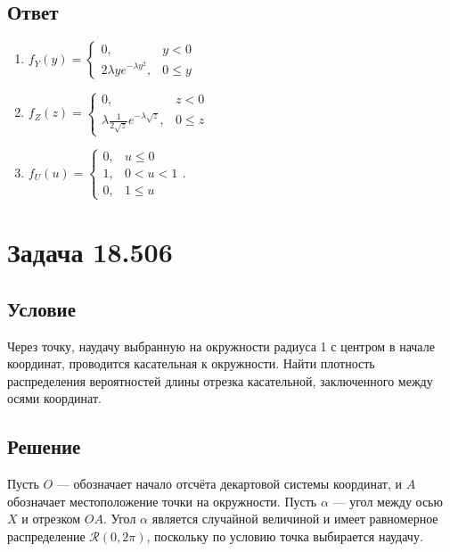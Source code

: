 \documentclass[12pt,a4paper]{article}
\begin{document}
    \subsection*{Ответ}
    \begin{enumerate}
        \item
        $
        f_Y(y)
        = \left \{
        \begin{array}{ll}
            0 ,                            & y < 0   \\
            2 \lambda y e^{- \lambda y^2}, & 0 \le y
        \end{array}
        \right .
        $
        \item
        $
        f_Z(z)
        = \left \{
        \begin{array}{ll}
            0,                                                   & z < 0   \\
            \lambda \frac{1}{2 \sqrt{z}} e^{- \lambda \sqrt{z}}, & 0 \le z
        \end{array}
        \right .
        $
        \item
        $
        f_U(u)
        = \left \{
        \begin{array}{ll}
            0,  & u \le 0   \\
            1 , & 0 < u < 1 \\
            0,  & 1 \le u
        \end{array}
        \right .
        .
        $
    \end{enumerate}


    \section{Задача 18.506}
    \subsection*{Условие}
    Через точку, наудачу выбранную на окружности радиуса 1 с центром в начале координат, проводится касательная к окружности. Найти плотность распределения вероятностей
    длины отрезка касательной, заключенного между осями координат.

    \subsection*{Решение}
    Пусть $O$ --- обозначает начало отсчёта декартовой системы координат, и $A$ обозначает местоположение точки на окружности. Пусть $\alpha$ --- угол между осью $X$ и
    отрезком $OA$. Угол $\alpha$ является случайной величиной и имеет равномерное распределение $\mathcal{R}(0, 2 \pi)$, поскольку по условию точка выбирается наудачу.
\end{document}
